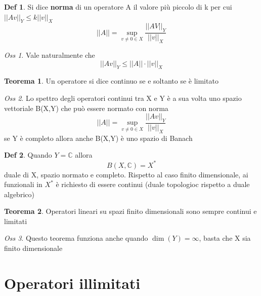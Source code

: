 \documentclass[a4paper,11pt]{report}
\theoremstyle{remark}
\newtheorem*{oss}{Oss}
\theoremstyle{definition}
\newtheorem*{teo}{Teorema}
\newtheorem*{Def}{Def}
\newcommand{\C}{\mathbb{C}}
\begin{document}
\begin{Def}
	Si dice \textbf{norma} di un operatore A il valore più piccolo di k per cui ${||Av||}_Y \le k {||v||}_X$
	\begin{equation*}
		||A|| = \sup_{v \ne 0 \in X} \frac{{||AV||}_Y}{{||v||}_X}
	\end{equation*}
\end{Def}

\begin{oss}
	Vale naturalmente che 
	\begin{equation*}
		{||Av||}_Y \le ||A|| \cdot {||v||}_X
	\end{equation*}
\end{oss}

\begin{teo}
	Un operatore si dice continuo se e soltanto se è limitato
\end{teo}

\begin{oss}
	Lo spettro degli operatori continui tra X e Y è a sua volta uno spazio vettoriale B(X,Y) che può essere normato con norma
	\begin{equation*}
		||A|| = \sup_{v\ne 0 \in X} \frac{{||Av||}_Y}{{||v||}_X}
	\end{equation*}
	se Y è completo allora anche B(X,Y) è uno spazio di Banach
\end{oss}

\begin{Def}
	Quando $Y = \C$ allora 
	\begin{equation*}
		B(X,\C) = X^*
	\end{equation*}
	duale di X, spazio normato e completo. Rispetto al caso finito dimensionale, ai funzionali in $X^*$ è richiesto di essere continui (duale topologioc rispetto a duale algebrico)
\end{Def}

\begin{teo}
	Operatori lineari su spazi finito dimensionali sono sempre continui e limitati
\end{teo}

\begin{oss}
	Questo teorema funziona anche quando $\dim(Y) = \infty$, basta che X sia finito dimensionale
\end{oss}

\section{Operatori illimitati}
\end{document}
